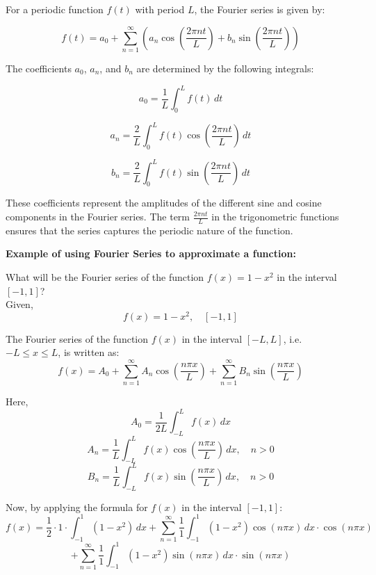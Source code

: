 \documentclass{MathematicaReport}
\begin{document}
For a periodic function \(f(t)\) with period \(L\), the Fourier series is given by:

\begin{equation*}
f(t) = a_0 + \sum_{n=1}^{\infty} \left( a_n \cos\left(\frac{2\pi nt}{L}\right) + b_n \sin\left(\frac{2\pi nt}{L}\right) \right)
\end{equation*}

The coefficients \(a_0\), \(a_n\), and \(b_n\) are determined by the following integrals:

\begin{equation*}
a_0 = \frac{1}{L} \int_{0}^{L} f(t) \, dt
\end{equation*}

\begin{equation*}
a_n = \frac{2}{L} \int_{0}^{L} f(t) \cos\left(\frac{2\pi nt}{L}\right) \, dt
\end{equation*}

\begin{equation*}
b_n = \frac{2}{L} \int_{0}^{L} f(t) \sin\left(\frac{2\pi nt}{L}\right) \, dt
\end{equation*}

These coefficients represent the amplitudes of the different sine and cosine components in the Fourier series. The term \(\frac{2\pi nt}{L}\) in the trigonometric functions ensures that the series captures the periodic nature of the function.

\textbf{Example of using Fourier Series to approximate a function:}

What will be the Fourier series of the function $f(x)=1-x^2$ in the interval $[-1,1]$? \\

Given,
\[ f(x) = 1 - x^2, \quad [-1, 1] \]

The Fourier series of the function \( f(x) \) in the interval \([-L, L]\), i.e. \(-L \leq x \leq L\), is written as:
\[ f(x) = A_0 + \sum_{n=1}^{\infty} A_n \cos\left(\frac{n\pi x}{L}\right) + \sum_{n=1}^{\infty} B_n \sin\left(\frac{n\pi x}{L}\right) \]

Here,
\[ A_0 = \frac{1}{2L} \int_{-L}^{L} f(x) \,dx \]
\[ A_n = \frac{1}{L} \int_{-L}^{L} f(x) \cos\left(\frac{n\pi x}{L}\right) \,dx, \quad n > 0 \]
\[ B_n = \frac{1}{L} \int_{-L}^{L} f(x) \sin\left(\frac{n\pi x}{L}\right) \,dx, \quad n > 0 \]

Now, by applying the formula for \( f(x) \) in the interval \([-1, 1]\):
\[ f(x) = \frac{1}{2} \cdot 1 \cdot \int_{-1}^{1} (1 - x^2) \,dx + \sum_{n=1}^{\infty} \frac{1}{1} \int_{-1}^{1} (1 - x^2) \cos(n\pi x) \,dx \cdot \cos(n\pi x) \]
\[ + \sum_{n=1}^{\infty} \frac{1}{1} \int_{-1}^{1} (1 - x^2) \sin(n\pi x) \,dx \cdot \sin(n\pi x) \]
\end{document}
